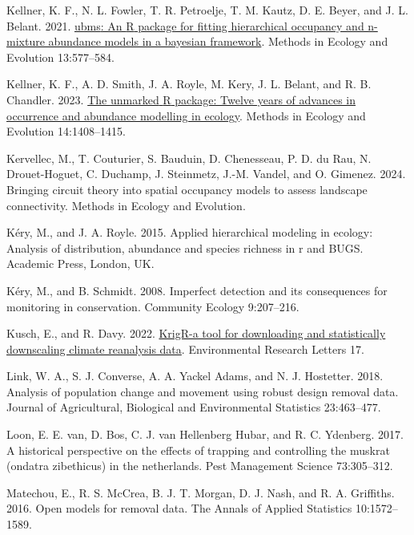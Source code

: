\documentclass[
  11pt,
  a4paper,
]{article}
\newlength{\cslhangindent}
\newenvironment{CSLReferences}[2] %
 {\begin{list}{}{%
  \setlength{\itemindent}{0pt}
  \setlength{\leftmargin}{0pt}
  \setlength{\parsep}{0pt}
  \ifodd #1
   \setlength{\leftmargin}{\cslhangindent}
   \setlength{\itemindent}{-1\cslhangindent}
  \fi
  \setlength{\itemsep}{#2\baselineskip}}}
 {\end{list}}
\begin{document}
\begin{CSLReferences}{1}{0}
Kellner, K. F., N. L. Fowler, T. R. Petroelje, T. M. Kautz, D. E. Beyer, and J. L. Belant. 2021. \href{https://doi.org/10.1111/2041-210X.13777}{{ubms}: An {R} package for fitting hierarchical occupancy and n-mixture abundance models in a bayesian framework}. Methods in Ecology and Evolution 13:577--584.

Kellner, K. F., A. D. Smith, J. A. Royle, M. Kery, J. L. Belant, and R. B. Chandler. 2023. \href{https://www.jstatsoft.org/v43/i10/}{The {unmarked} {R} package: Twelve years of advances in occurrence and abundance modelling in ecology}. Methods in Ecology and Evolution 14:1408--1415.

Kervellec, M., T. Couturier, S. Bauduin, D. Chenesseau, P. D. du Rau, N. Drouet-Hoguet, C. Duchamp, J. Steinmetz, J.-M. Vandel, and O. Gimenez. 2024. Bringing circuit theory into spatial occupancy models to assess landscape connectivity. Methods in Ecology and Evolution.

Kéry, M., and J. A. Royle. 2015. Applied hierarchical modeling in ecology: Analysis of distribution, abundance and species richness in r and BUGS. Academic Press, London, UK.

Kéry, M., and B. Schmidt. 2008. Imperfect detection and its consequences for monitoring in conservation. Community Ecology 9:207--216.

Kusch, E., and R. Davy. 2022. \href{https://doi.org/10.1088/1748-9326/ac48b3}{KrigR-a tool for downloading and statistically downscaling climate reanalysis data}. Environmental Research Letters 17.

Link, W. A., S. J. Converse, A. A. Yackel Adams, and N. J. Hostetter. 2018. Analysis of population change and movement using robust design removal data. Journal of Agricultural, Biological and Environmental Statistics 23:463--477.

Loon, E. E. van, D. Bos, C. J. van Hellenberg Hubar, and R. C. Ydenberg. 2017. A historical perspective on the effects of trapping and controlling the muskrat (ondatra zibethicus) in the netherlands. Pest Management Science 73:305--312.

Matechou, E., R. S. McCrea, B. J. T. Morgan, D. J. Nash, and R. A. Griffiths. 2016. {Open models for removal data}. The Annals of Applied Statistics 10:1572--1589.


\end{CSLReferences}
\end{document}
